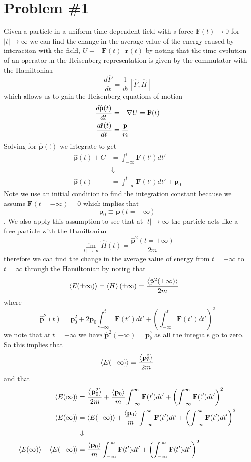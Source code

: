 \documentclass[11pt]{article}
\numberwithin{equation}{section}
\begin{document}


\section{Problem \#1}
Given a particle in a uniform time-dependent field with a force $\mathbf{F}(t)\rightarrow{0}$
for $|t|\rightarrow\infty$ we can find the change in the average value of the energy caused
by interaction with the field, $U = -\mathbf{F}(t)\cdot\mathbf{r}(t)$ by noting that the
time evolution of an operator in the Heisenberg representation is given by the commutator 
with the Hamiltonian
$$\frac{d\hat{F}}{dt} =  \frac{1}{i\hbar}[\hat{F},\hat{H}]$$
which allows us to gain the Heisenberg equations of motion
\begin{align*}
\frac{d\hat{\mathbf{p}}(t)}{dt} &= -\bold\nabla{U} = \mathbf{F}(t)\\
\frac{d\hat{\mathbf{r}}(t)}{dt} &= \frac{\mathbf{p}}{m}
\end{align*}
Solving for $\hat{\mathbf{p}}(t)$ we integrate to get
\begin{align*}
\hat{\mathbf{p}}(t) + C &= \int_{-\infty}^{t}\mathbf{F}(t')dt'\\
&\Downarrow\\
\hat{\mathbf{p}}(t) &= \int_{-\infty}^{t}\mathbf{F}(t')dt' + \mathbf{p}_0
\end{align*}
Note we use an initial condition to find the integration constant because we assume 
$\mathbf{F}(t=-\infty)=0$ which implies that 
$$\mathbf{p}_{0} \equiv \mathbf{p}(t=-\infty)$$. We also apply this assumption to see that 
at $|t|\rightarrow\infty$ the particle acts like a free particle with the Hamiltonian
$$\lim_{|t|\rightarrow\infty}\hat{H}(t) = \frac{\hat{\mathbf{p}}^2(t=\pm\infty)}{2m}$$
therefore we can find the change in the average value of energy from $t=-\infty$ to $t=\infty$
through the Hamiltonian by noting that
\begin{align*}
\left\langle{E(\pm\infty)}\right\rangle &= \left\langle{H}\right\rangle(\pm\infty) = \frac{\left\langle{\hat{\mathbf{p}}^2(\pm\infty)}\right\rangle}{2m}
\end{align*}
where
$$\hat{\mathbf{p}}^2(t) = \mathbf{p}_0^2 + 2\mathbf{p}_0\int_{-\infty}^{t}\mathbf{F}(t')dt' + \left(\int_{-\infty}^{t}\mathbf{F}(t')dt'\right)^2$$
we note that at $t=-\infty$ we have $\hat{\mathbf{p}}^2(-\infty) = \mathbf{p}_0^2$ as all the
integrals go to zero. So this implies that
$$\left\langle{E(-\infty)}\right\rangle = \frac{\left\langle{\mathbf{p}_0^2}\right\rangle}{2m}$$
and that
\begin{align*}
\left\langle{E(\infty)}\right\rangle &= \frac{\left\langle{\mathbf{p}_0^2}\right\rangle}{2m} + \frac{\left\langle{\mathbf{p}_0}\right\rangle}{m}\int_{-\infty}^{\infty}\mathbf{F}(t')dt' + \left(\int_{-\infty}^{\infty}\mathbf{F}(t')dt'\right)^2\\
\left\langle{E(\infty)}\right\rangle &= \left\langle{E(-\infty)}\right\rangle + \frac{\left\langle{\mathbf{p}_0}\right\rangle}{m}\int_{-\infty}^{\infty}\mathbf{F}(t')dt' + \left(\int_{-\infty}^{\infty}\mathbf{F}(t')dt'\right)^2\\
&\Downarrow\\
\left\langle{E(\infty)}\right\rangle - \left\langle{E(-\infty)}\right\rangle &= \frac{\left\langle{\mathbf{p}_0}\right\rangle}{m}\int_{-\infty}^{\infty}\mathbf{F}(t')dt' + \left(\int_{-\infty}^{\infty}\mathbf{F}(t')dt'\right)^2
\end{align*}
\end{document}
